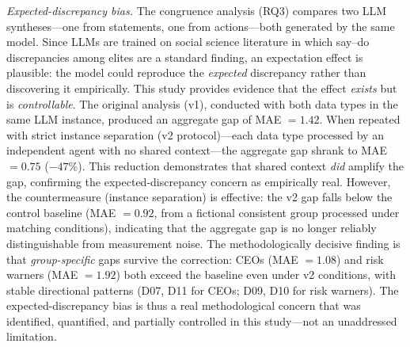 \documentclass[12pt,a4paper]{article}
\begin{document}
\emph{Expected-discrepancy bias.} The congruence analysis (RQ3) compares two LLM syntheses---one from statements, one from actions---both generated by the same model. Since LLMs are trained on social science literature in which say--do discrepancies among elites are a standard finding, an expectation effect is plausible: the model could reproduce the \emph{expected} discrepancy rather than discovering it empirically. This study provides evidence that the effect \emph{exists} but is \emph{controllable}. The original analysis (v1), conducted with both data types in the same LLM instance, produced an aggregate gap of MAE $= 1.42$. When repeated with strict instance separation (v2 protocol)---each data type processed by an independent agent with no shared context---the aggregate gap shrank to MAE $= 0.75$ ($-47\%$). This reduction demonstrates that shared context \emph{did} amplify the gap, confirming the expected-discrepancy concern as empirically real. However, the countermeasure (instance separation) is effective: the v2 gap falls below the control baseline (MAE $= 0.92$, from a fictional consistent group processed under matching conditions), indicating that the aggregate gap is no longer reliably distinguishable from measurement noise. The methodologically decisive finding is that \emph{group-specific} gaps survive the correction: CEOs (MAE $= 1.08$) and risk warners (MAE $= 1.92$) both exceed the baseline even under v2 conditions, with stable directional patterns (D07, D11 for CEOs; D09, D10 for risk warners). The expected-discrepancy bias is thus a real methodological concern that was identified, quantified, and partially controlled in this study---not an unaddressed limitation.
\end{document}
